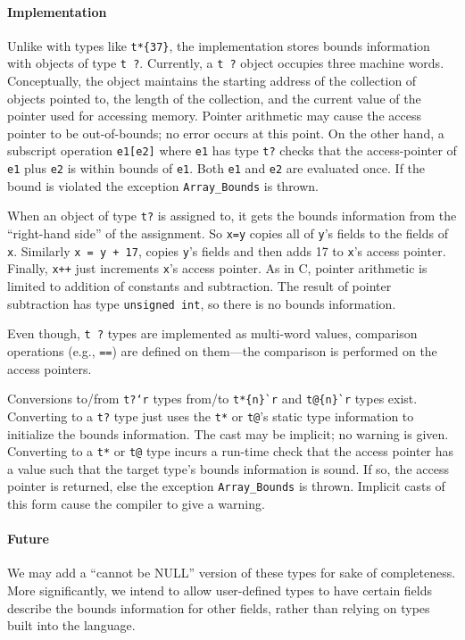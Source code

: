 \paragraph{Implementation} Unlike with types like \verb|t*{37}|,
the implementation stores bounds information with objects of type
\texttt{t ?}.  Currently, a \texttt{t ?} object occupies three machine
words.  Conceptually, the object maintains the starting address of the
collection of objects pointed to, the length of the collection, and
the current value of the pointer used for accessing memory.  Pointer
arithmetic may cause the access pointer to be out-of-bounds; no error
occurs at this point.  On the other hand, a subscript operation
\texttt{e1[e2]} where \texttt{e1} has type \texttt{t?} checks that the
access-pointer of \texttt{e1} plus \texttt{e2} is within bounds of
\texttt{e1}.  Both \texttt{e1} and \texttt{e2} are evaluated once.  If the
bound is violated the exception \texttt{Array_Bounds} is thrown.

When an object of type \texttt{t?} is assigned to, it gets the bounds
information from the ``right-hand side'' of the assignment.  So
\texttt{x=y} copies all of \texttt{y}'s fields to the fields of \texttt{x}.
Similarly \texttt{x = y + 17}, copies \texttt{y}'s fields and then adds 17
to \texttt{x}'s access pointer.  Finally, \texttt{x++} just increments
\texttt{x}'s access pointer.  As in C, pointer arithmetic is limited to
addition of constants and subtraction.  The result of pointer
subtraction has type \texttt{unsigned int}, so there is no bounds
information.

Even though, \texttt{t ?} types are implemented as multi-word values,
comparison operations (e.g., \texttt{==}) are defined on them---the
comparison is performed on the access pointers.

Conversions to/from \texttt{t?`r} types from/to \verb|t*{n}`r| and
\verb|t@{n}`r| types exist.  Converting to a \texttt{t?} type just uses
the \texttt{t*} or \texttt{t@}'s static type information to initialize the
bounds information.  The cast may be implicit; no warning is given.
Converting to a \texttt{t*} or \texttt{t@} type incurs a run-time check
that the access pointer has a value such that the target type's bounds
information is sound.  If so, the access pointer is returned, else the
exception \texttt{Array_Bounds} is thrown.  Implicit casts of this form
cause the compiler to give a warning.


\paragraph{Future} We may add a ``cannot be NULL'' version of these types
for sake of completeness.  More significantly, we intend to allow
user-defined types to have certain fields describe the bounds
information for other fields, rather than relying on types built into
the language.

